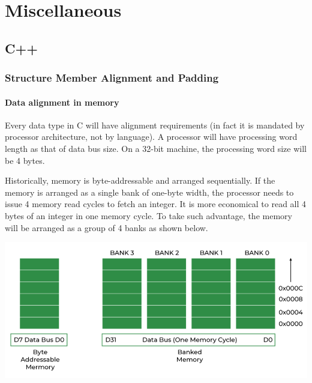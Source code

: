 \documentclass[../main]{subfiles}
\begin{document}
\chapter{Miscellaneous}
\section{C++}
\subsection{Structure Member Alignment and Padding}
\subsubsection{Data alignment in memory}
    Every data type in C will have alignment requirements (in fact it is mandated by processor architecture, not by language).
A processor will have processing word length as that of data bus size. On a 32-bit machine, the processing word size will be 4 bytes.\newline

    Historically, memory is byte-addressable and arranged sequentially. If the memory is arranged as a single bank of one-byte width,
the processor needs to issue 4 memory read cycles to fetch an integer. It is more economical to read all 4 bytes of an integer in one memory cycle.
To take such advantage, the memory will be arranged as a group of 4 banks as shown below.
\begin{center}
    \includegraphics[scale=0.7]{Pictures/banks.png}
\end{center}
\end{document}
